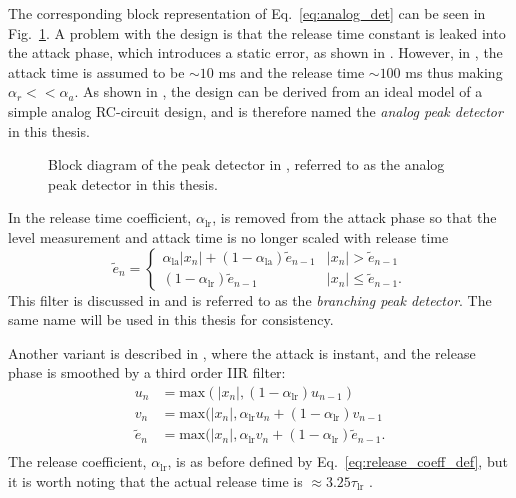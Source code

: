 \documentclass[../main2.tex]{subfiles}
\providecommand{\rootdir}{..}
\begin{document}
The corresponding block representation of Eq.~\eqref{eq:analog_det} can be seen in Fig.~\ref{fig:block_mcnally_theory_peak}. A problem with the design is that the release time constant is leaked into the attack phase, which introduces a static error, as shown in \cite{reiss2012tutorial}. However, in \cite{mcnally1984dynamic}, the attack time is assumed to be $\sim 10$ ms and the release time   $\sim 100$ ms thus making $\alpha_r << \alpha_a$. As shown in \cite{reiss2012tutorial}, the design can be derived from an ideal model of a simple analog RC-circuit design, and is therefore named the \emph{analog peak detector} in this thesis.
\begin{figure}
\centerline{}
\caption{Block diagram of the peak detector in \cite{mcnally1984dynamic}, referred to as the analog peak detector in this thesis.}
\label{fig:block_mcnally_theory_peak}
\end{figure}

In \cite{zolzer2008digital} the release time coefficient, $\alpha_\text{lr}$, is removed from the attack phase so that the level measurement and attack time is no longer scaled with release time
\begin{equation}
\tilde{e}_n = \begin{cases}
    \alpha_\text{la} |x_n| + (1-\alpha_\text{la}) \tilde{e}_{n-1} 	& |x_n| > \tilde{e}_{n-1} \\
    (1-\alpha_\text{lr}) \tilde{e}_{n-1} 						& |x_n| \leq \tilde{e}_{n-1}.
\end{cases}
\end{equation}
This filter is discussed in \cite{reiss2012tutorial} and is referred to as the \emph{branching peak detector}. The same name will be used in this thesis for consistency.

Another variant is described in \cite{stikvoort1986digital}, where the attack is instant, and the release phase is smoothed by a third order IIR filter:
\begin{equation}\label{eq:stikvoort_release}
\begin{split}
u_n &= \text{max}(|x_n|, (1-\alpha_\text{lr}) u_{n-1}) \\
v_n &= \text{max}(|x_n|, \alpha_\text{lr} u_n + (1-\alpha_\text{lr}) v_{n-1} \\
\tilde{e}_n &= \text{max}(|x_n|, \alpha_\text{lr} v_n + (1-\alpha_\text{lr}) \tilde{e}_{n-1}. \\
\end{split}
\end{equation}
The release coefficient, $\alpha_\text{lr}$, is as before defined by Eq.~\eqref{eq:release_coeff_def}, but it is worth noting that the actual release time is $\approx 3.25 \tau_\text{lr}$ \cite{stikvoort1986digital}.
\end{document}
